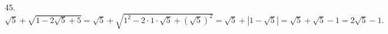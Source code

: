 45. $\sqrt{5}+\sqrt{1-2\sqrt{5}+5}=\sqrt{5}+\sqrt{1^2-2\cdot1\cdot\sqrt{5}+(\sqrt{5})^2}=\sqrt{5}+|1-\sqrt{5}|=\sqrt{5}+\sqrt{5}-1=2\sqrt{5}-1.$\\
